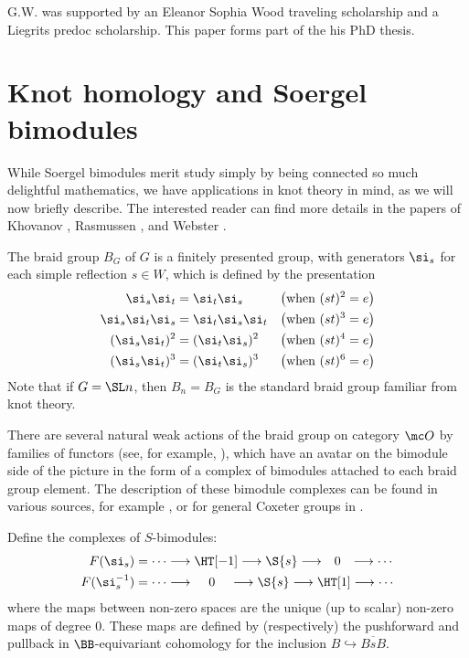 \documentclass[12pt]{wart}
\theoremstyle{remark}
\begin{document}
G.W. was supported by an Eleanor Sophia Wood traveling scholarship and a Liegrits predoc scholarship. This paper forms part of the his PhD thesis.

\section{Knot homology and Soergel bimodules}
\label{sec:knot-homol-soerg}

While Soergel bimodules merit study simply by being connected so much
delightful mathematics, we have applications in knot theory in mind,
as we will now briefly describe.  The interested reader can find more
details in the papers of Khovanov \cite{Kho05}, %
Rasmussen \cite{Ras06}, and Webster \cite{Web06a}.


The braid group $B_G$ of $G$ is a finitely presented group, with generators $\si_s$ for each simple reflection $s\in W$, which is defined by the presentation
\begin{align*}
 \si_s\si_t&=\si_t\si_s & \big(\text{when }(st)^2=e\big)\\
 \si_s\si_t\si_s&=\si_t\si_s\si_t & \big(\text{when }(st)^3=e\big)\\
(\si_s\si_t)^2&=(\si_t\si_s)^2 & \big(\text{when }(st)^4=e\big)\\
(\si_s\si_t)^3&=(\si_t\si_s)^3 & \big(\text{when }(st)^6=e\big)
\end{align*}
Note that if $G=\SL n$, then $B_n=B_G$ is the standard braid group familiar
from knot theory.

There are several natural weak actions of the braid group on category
$\mc O$ by families of functors (see, for example, \cite{AS,KM}),
which have an avatar on the bimodule side of the picture in the form
of a complex of bimodules attached to each braid group element.  The
description of these bimodule complexes can be found in various
sources, for example \cite{Kho05}, or for general Coxeter groups in
\cite{Rou04}.

Define the complexes of $S$-bimodules:
\begin{align*}
  F(\si_s)&=\cdots\longrightarrow \HT[-1]\longrightarrow \S{s}\longrightarrow  \hspace{2.5mm}0 \hspace{2.5mm}\longrightarrow \cdots\\
  F(\si_s^{-1})&=\cdots\longrightarrow \hspace{4mm}0 \hspace{4mm}\longrightarrow \S{s}\longrightarrow \HT[1]\longrightarrow \cdots
\end{align*}
where the maps between non-zero spaces are the unique (up to scalar)
non-zero maps of degree 0.  These maps are defined by (respectively) the pushforward and pullback in $\BB$-equivariant cohomology for the inclusion $B\hookrightarrow \overline{BsB}$.
\end{document}
